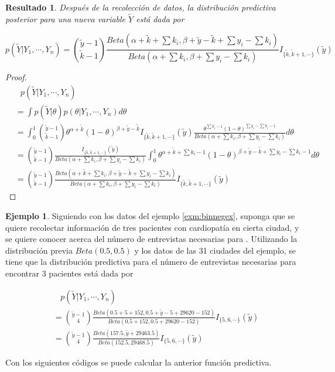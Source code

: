 \documentclass[
  10pt,
  spanish,
]{book}
\newtheorem{proposition}{Resultado}[chapter]
\theoremstyle{definition}
\theoremstyle{definition}
\newtheorem{example}{Ejemplo}[chapter]
\theoremstyle{definition}
\theoremstyle{definition}
\theoremstyle{remark}
\begin{document}
\begin{proposition}
\protect\hypertarget{prp:unnamed-chunk-39}{}{\label{prp:unnamed-chunk-39} }Después de la recolección de datos, la distribución predictiva posterior para una nueva variable \(\tilde{Y}\) está dada por

\begin{equation*}
p(\tilde{Y}|Y_1,\cdots,Y_n)=\binom{\tilde{y}-1}{\tilde{k}-1}\frac{Beta(\alpha+\tilde{k}+\sum k_i,\beta+\tilde{y}-\tilde{k}+\sum y_i-\sum k_i)}{Beta(\alpha+\sum k_i,\beta+\sum y_i-\sum k_i)}I_{\{\tilde{k},\tilde{k}+1,\cdots\}}(\tilde{y})
\end{equation*}
\end{proposition}

\begin{proof}
{}\begin{align*}
&\ \ \ p(\tilde{Y}|Y_1,\cdots,Y_n)\\
&=\int p(\tilde{Y}|\theta)p(\theta|Y_1,\cdots,Y_n)d\theta\\
&=\int_{0}^1\binom{\tilde{y}-1}{\tilde{k}-1}\theta^{\alpha+\tilde{k}}(1-\theta)^{\beta+\tilde{y}-\tilde{k}}I_{\{\tilde{k},\tilde{k}+1,\cdots\}}(\tilde{y})\frac{\theta^{\sum k_i-1}(1-\theta)^{\sum y_i-\sum k_i-1}}{Beta(\alpha+\sum k_i,\beta+\sum y_i-\sum k_i)}d\theta\\
&=\binom{\tilde{y}-1}{\tilde{k}-1}\frac{I_{\{\tilde{k},\tilde{k}+1,\cdots\}}(\tilde{y})}{Beta(\alpha+\sum k_i,\beta+\sum y_i-\sum k_i)}\int_{0}^1\theta^{\alpha+\tilde{k}+\sum k_i-1}(1-\theta)^{\beta+\tilde{y}-\tilde{k}+\sum y_i-\sum k_i-1}d\theta\\
&=\binom{\tilde{y}-1}{\tilde{k}-1}\frac{Beta(\alpha+\tilde{k}+\sum k_i,\beta+\tilde{y}-\tilde{k}+\sum y_i-\sum k_i)}{Beta(\alpha+\sum k_i,\beta+\sum y_i-\sum k_i)}I_{\{\tilde{k},\tilde{k}+1,\cdots\}}(\tilde{y})
\end{align*}
\end{proof}

\begin{example}
\protect\hypertarget{exm:unnamed-chunk-41}{}{\label{exm:unnamed-chunk-41} }Siguiendo con los datos del ejemplo \ref{exm:binnegex}, suponga que se quiere recolectar información de tres pacientes con cardiopatía en cierta ciudad, y se quiere conocer acerca del número de entrevistas necesarias para . Utilizando la distribución previa \(Beta(0.5,0.5)\) y los datos de las 31 ciudades del ejemplo, se tiene que la distribución predictiva para el número de entrevistas necesarias para encontrar 3 pacientes está dada por

\begin{align*}
&\ \ \ \ p(\tilde{Y}|Y_1,\cdots,Y_n)\\
&=\binom{\tilde{y}-1}{4}\frac{Beta(0.5+5+152,0.5+\tilde{y}-5+29620-152)}{Beta(0.5+152,0.5+29620-152)}I_{\{5,6,\cdots\}}(\tilde{y})\\
&=\binom{\tilde{y}-1}{4}\frac{Beta(157.5,\tilde{y}+29463.5)}{Beta(152.5,29468.5)}I_{\{5,6,\cdots\}}(\tilde{y})
\end{align*}

Con los siguientes códigos se puede calcular la anterior función predictiva.
\end{example}
\end{document}
